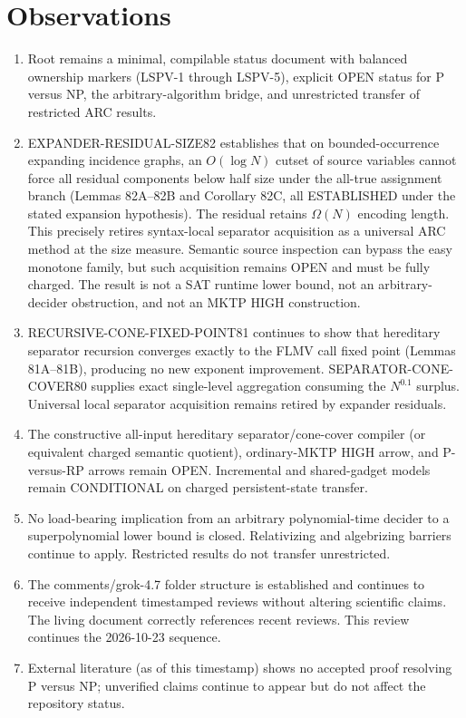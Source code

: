 \documentclass[11pt]{article}
\begin{document}
\section{Observations}
\begin{enumerate}
\item Root  remains a minimal, compilable status document with balanced ownership markers (LSPV-1 through LSPV-5), explicit OPEN status for P versus NP, the arbitrary-algorithm bridge, and unrestricted transfer of restricted ARC results.
\item EXPANDER-RESIDUAL-SIZE82 establishes that on bounded-occurrence expanding incidence graphs, an $O(\log N)$ cutset of source variables cannot force all residual components below half size under the all-true assignment branch (Lemmas 82A--82B and Corollary 82C, all ESTABLISHED under the stated expansion hypothesis). The residual retains $\Omega(N)$ encoding length. This precisely retires syntax-local separator acquisition as a universal ARC method at the size measure. Semantic source inspection can bypass the easy monotone family, but such acquisition remains OPEN and must be fully charged. The result is not a SAT runtime lower bound, not an arbitrary-decider obstruction, and not an MKTP HIGH construction.
\item RECURSIVE-CONE-FIXED-POINT81 continues to show that hereditary separator recursion converges exactly to the FLMV call fixed point (Lemmas 81A--81B), producing no new exponent improvement. SEPARATOR-CONE-COVER80 supplies exact single-level aggregation consuming the $N^{0.1}$ surplus. Universal local separator acquisition remains retired by expander residuals.
\item The constructive all-input hereditary separator/cone-cover compiler (or equivalent charged semantic quotient), ordinary-MKTP HIGH arrow, and P-versus-RP arrows remain OPEN. Incremental and shared-gadget models remain CONDITIONAL on charged persistent-state transfer.
\item No load-bearing implication from an arbitrary polynomial-time decider to a superpolynomial lower bound is closed. Relativizing and algebrizing barriers continue to apply. Restricted results do not transfer unrestricted.
\item The comments/grok-4.7 folder structure is established and continues to receive independent timestamped reviews without altering scientific claims. The living document correctly references recent reviews. This review continues the 2026-10-23 sequence.
\item External literature (as of this timestamp) shows no accepted proof resolving P versus NP; unverified claims continue to appear but do not affect the repository status.
\end{enumerate}
\end{document}

